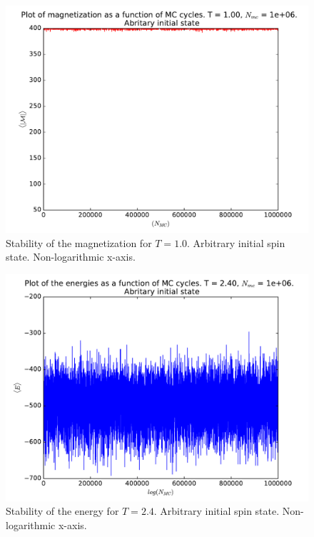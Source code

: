 \documentclass[12pt]{article}
\begin{document}
\begin{figure}[H]
\centering
\includegraphics[width=\linewidth]{Plots/Magnetization_stability_T1.pdf}
\caption{Stability of the magnetization for $T=1.0$. Arbitrary initial spin state. Non-logarithmic x-axis.}
\end{figure}

\begin{figure}[H]
\centering
\includegraphics[width=\linewidth]{Plots/Energy_stability_T24.pdf}
\caption{Stability of the energy for $T=2.4$. Arbitrary initial spin state. Non-logarithmic x-axis.}
\end{figure}
\end{document}
